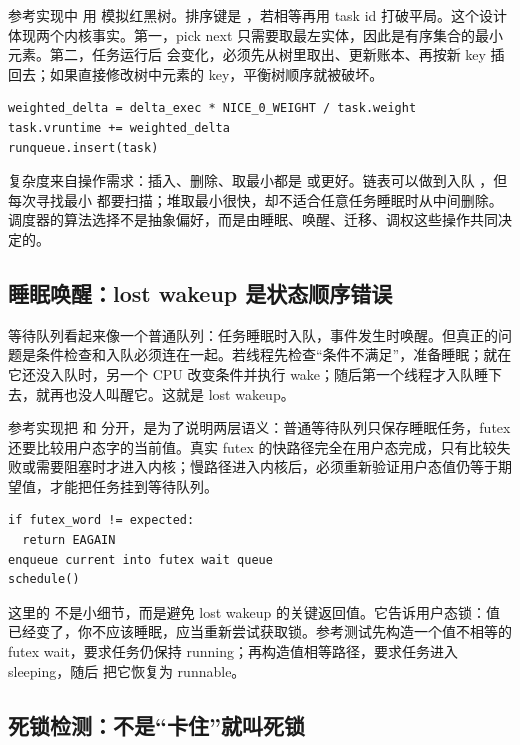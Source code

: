 参考实现中  用  模拟红黑树。排序键是 ，若相等再用 task id 打破平局。这个设计体现两个内核事实。第一，pick next 只需要取最左实体，因此是有序集合的最小元素。第二，任务运行后  会变化，必须先从树里取出、更新账本、再按新 key 插回去；如果直接修改树中元素的 key，平衡树顺序就被破坏。

\begin{lstlisting}
weighted_delta = delta_exec * NICE_0_WEIGHT / task.weight
task.vruntime += weighted_delta
runqueue.insert(task)
\end{lstlisting}

复杂度来自操作需求：插入、删除、取最小都是  或更好。链表可以做到入队 ，但每次寻找最小  都要扫描；堆取最小很快，却不适合任意任务睡眠时从中间删除。调度器的算法选择不是抽象偏好，而是由睡眠、唤醒、迁移、调权这些操作共同决定的。

\subsection{睡眠唤醒：lost wakeup 是状态顺序错误}

等待队列看起来像一个普通队列：任务睡眠时入队，事件发生时唤醒。但真正的问题是条件检查和入队必须连在一起。若线程先检查“条件不满足”，准备睡眠；就在它还没入队时，另一个 CPU 改变条件并执行 wake；随后第一个线程才入队睡下去，就再也没人叫醒它。这就是 lost wakeup。

参考实现把  和  分开，是为了说明两层语义：普通等待队列只保存睡眠任务，futex 还要比较用户态字的当前值。真实 futex 的快路径完全在用户态完成，只有比较失败或需要阻塞时才进入内核；慢路径进入内核后，必须重新验证用户态值仍等于期望值，才能把任务挂到等待队列。

\begin{lstlisting}
if futex_word != expected:
  return EAGAIN
enqueue current into futex wait queue
schedule()
\end{lstlisting}

这里的  不是小细节，而是避免 lost wakeup 的关键返回值。它告诉用户态锁：值已经变了，你不应该睡眠，应当重新尝试获取锁。参考测试先构造一个值不相等的 futex wait，要求任务仍保持 running；再构造值相等路径，要求任务进入 sleeping，随后  把它恢复为 runnable。

\subsection{死锁检测：不是“卡住”就叫死锁}

